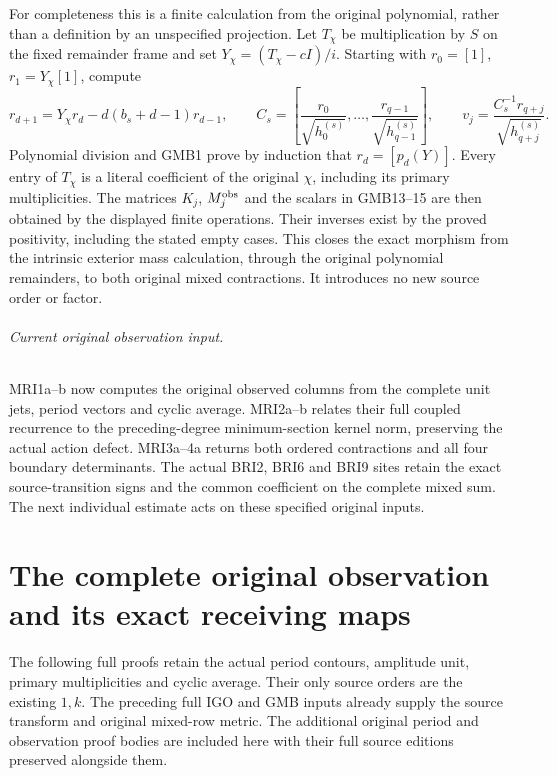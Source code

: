 \documentclass[11pt,a4paper]{article}
\begin{document}
For completeness this is a finite calculation from the original
polynomial, rather than a definition by an unspecified projection.
Let $T_\chi$ be multiplication by $S$ on the fixed remainder frame
and set $Y_\chi=(T_\chi-cI)/i$. Starting with
$r_0=[1]$, $r_1=Y_\chi[1]$, compute
\[
 r_{d+1}=Y_\chi r_d-d(b_s+d-1)r_{d-1},\qquad
 C_s=\left[\frac{r_0}{\sqrt{h_0^{(s)}}},\ldots,
                 \frac{r_{q-1}}{\sqrt{h_{q-1}^{(s)}}}\right],
 \qquad v_j=\frac{C_s^{-1}r_{q+j}}{\sqrt{h_{q+j}^{(s)}}}.
 \tag{GMB16}
\]
Polynomial division and GMB1 prove by induction that $r_d=[p_d(Y)]$.
Every entry of $T_\chi$ is a literal coefficient of the original
$\chi$, including its primary multiplicities. The matrices
$K_j$, $M_j^{\rm obs}$ and the scalars in GMB13--15 are then obtained
by the displayed finite operations. Their inverses exist by the
proved positivity, including the stated empty cases. This closes
the exact morphism from the intrinsic exterior mass calculation,
through the original polynomial remainders, to both original
mixed contractions. It introduces no new source order or factor.




\paragraph{Current original observation input.}
MRI1a--b now computes the original observed columns from the complete
unit jets, period vectors and cyclic average. MRI2a--b relates their
full coupled recurrence to the preceding-degree minimum-section kernel
norm, preserving the actual action defect. MRI3a--4a returns both
ordered contractions and all four boundary determinants. The actual
BRI2, BRI6 and BRI9 sites retain the exact source-transition signs
and the common coefficient on the complete mixed sum. The next
individual estimate acts on these specified original inputs.

\clearpage
\part*{The complete original observation and its exact receiving maps}
The following full proofs retain the actual period contours, amplitude
unit, primary multiplicities and cyclic average. Their only source
orders are the existing $1,k$. The preceding full IGO and GMB inputs
already supply the source transform and original mixed-row metric.
The additional original period and observation proof bodies are
included here with their full source editions preserved alongside them.
\end{document}

